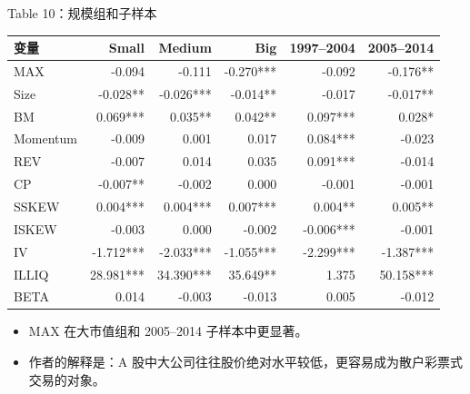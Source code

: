 \documentclass[aspectratio=169,10pt]{beamer}
\newcommand{\tinytab}{\tiny\setlength{\tabcolsep}{2.2pt}\renewcommand{\arraystretch}{1.08}}
\begin{document}
\begin{frame}{Table 10：规模组和子样本}
	\tinytab
	\begin{tabular}{lrrrrr}
		\toprule
		变量 & Small & Medium & Big & 1997--2004 & 2005--2014\\
		\midrule
		MAX & -0.094 & -0.111 & -0.270*** & -0.092 & -0.176**\\
		Size & -0.028** & -0.026*** & -0.014** & -0.017 & -0.017**\\
		BM & 0.069*** & 0.035** & 0.042** & 0.097*** & 0.028*\\
		Momentum & -0.009 & 0.001 & 0.017 & 0.084*** & -0.023\\
		REV & -0.007 & 0.014 & 0.035 & 0.091*** & -0.014\\
		CP & -0.007** & -0.002 & 0.000 & -0.001 & -0.001\\
		SSKEW & 0.004*** & 0.004*** & 0.007*** & 0.004** & 0.005**\\
		ISKEW & -0.003 & 0.000 & -0.002 & -0.006*** & -0.001\\
		IV & -1.712*** & -2.033*** & -1.055*** & -2.299*** & -1.387***\\
		ILLIQ & 28.981*** & 34.390*** & 35.649** & 1.375 & 50.158***\\
		BETA & 0.014 & -0.003 & -0.013 & 0.005 & -0.012\\
		\bottomrule
	\end{tabular}
	\vspace{4pt}
	\begin{itemize}
		\item MAX 在大市值组和 2005--2014 子样本中更显著。
		\item 作者的解释是：A 股中大公司往往股价绝对水平较低，更容易成为散户彩票式交易的对象。
	\end{itemize}
\end{frame}
\end{document}
